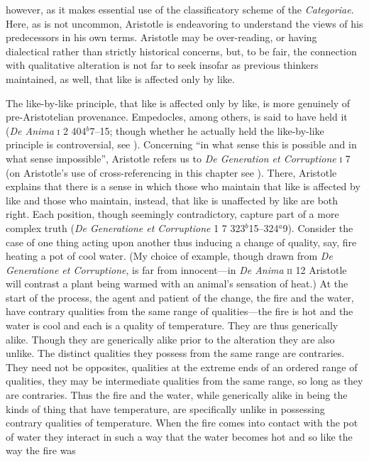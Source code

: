 however, as it makes essential use of the classificatory scheme of the \emph{Categoriae}. Here, as is not uncommon, Aristotle is endeavoring to understand the views of his predecessors in his own terms. Aristotle may be over-reading, or having dialectical rather than strictly historical concerns, but, to be fair, the connection with qualitative alteration is not far to seek insofar as previous thinkers maintained, as well, that like is affected only by like.

The like-by-like principle, that like is affected only by like, is more genuinely of pre-Aristotelian provenance. Empedocles, among others, is said to have held it (\emph{De Anima} \textsc{i} 2 404\( ^{b} \)7--15; though whether he actually held the like-by-like principle is controversial, see \citealt{Kamtekar:2009fk}). Concerning ``in what sense this is possible and in what sense impossible'', Aristotle refers us to \emph{De Generation et Corruptione} \textsc{i} 7 (on Aristotle's use of cross-referencing in this chapter see \citealt{Burnyeat:2002an}). There, Aristotle explains that there is a sense in which those who maintain that like is affected by like and those who maintain, instead, that like is unaffected by like are both right. Each position, though seemingly contradictory, capture part of a more complex truth (\emph{De Generatione et Corruptione} \textsc{1} 7 323\( ^{b} \)15--324\( ^{a} \)9). Consider the case of one thing acting upon another thus inducing a change of quality, say, fire heating a pot of cool water. (My choice of example, though drawn from \emph{De Generatione et Corruptione}, is far from innocent---in \emph{De Anima} \textsc{ii} 12 Aristotle will contrast a plant being warmed with an animal's sensation of heat.) At the start of the process, the agent and patient of the change, the fire and the water, have contrary qualities from the same range of qualities---the fire is hot and the water is cool and each is a quality of temperature. They are thus generically alike. Though they are generically alike prior to the alteration they are also unlike. The distinct qualities they possess from the same range are contraries. They need not be opposites, qualities at the extreme ends of an ordered range of qualities, they may be intermediate qualities from the same range, so long as they are contraries. Thus the fire and the water, while generically alike in being the kinds of thing that have temperature, are specifically unlike in possessing contrary qualities of temperature. When the fire comes into contact with the pot of water they interact in such a way that the water becomes hot and so like the way the fire was 
